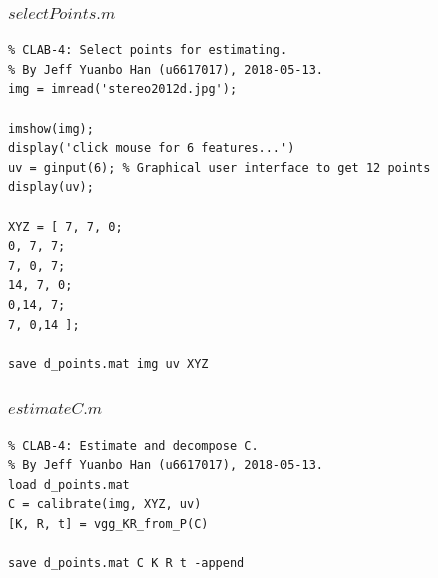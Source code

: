 \documentclass{article}
\begin{document}
\subsubsection{$selectPoints.m$}
\label{code-2.2}
\begin{lstlisting}
% CLAB-4: Select points for estimating.
% By Jeff Yuanbo Han (u6617017), 2018-05-13.
img = imread('stereo2012d.jpg');

imshow(img);
display('click mouse for 6 features...')
uv = ginput(6); % Graphical user interface to get 12 points
display(uv);

XYZ = [ 7, 7, 0;
0, 7, 7;
7, 0, 7;
14, 7, 0;
0,14, 7;
7, 0,14 ];

save d_points.mat img uv XYZ

\end{lstlisting}


\subsubsection{$estimateC.m$}
\label{code-2.3}
\begin{lstlisting}
% CLAB-4: Estimate and decompose C.
% By Jeff Yuanbo Han (u6617017), 2018-05-13.
load d_points.mat
C = calibrate(img, XYZ, uv)
[K, R, t] = vgg_KR_from_P(C)

save d_points.mat C K R t -append

\end{lstlisting}
\end{document}
